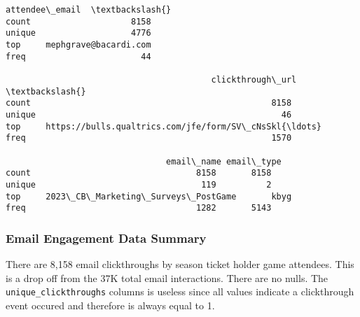 \documentclass[11pt]{article}
\makeatletter
\newcommand{\boxspacing}{\kern\kvtcb@left@rule\kern\kvtcb@boxsep}
\newcommand{\prompt}[4]{
        {\ttfamily\llap{{\color{#2}[#3]:\hspace{3pt}#4}}\vspace{-\baselineskip}}
    }
\makeatother
\begin{document}
            \begin{tcolorbox}[breakable, size=fbox, boxrule=.5pt, pad at break*=1mm, opacityfill=0]
\prompt{Out}{outcolor}{16}{\boxspacing}
\begin{Verbatim}[commandchars=\\\{\}]
               attendee\_email  \textbackslash{}
count                    8158
unique                   4776
top     mephgrave@bacardi.com
freq                       44

                                         clickthrough\_url  \textbackslash{}
count                                                8158
unique                                                 46
top     https://bulls.qualtrics.com/jfe/form/SV\_cNsSkl{\ldots}
freq                                                 1570

                                email\_name email\_type
count                                 8158       8158
unique                                 119          2
top     2023\_CB\_Marketing\_Surveys\_PostGame       kbyg
freq                                  1282       5143
\end{Verbatim}
\end{tcolorbox}
        
    \subsubsection{Email Engagement Data
Summary}\label{email-engagement-data-summary}

There are 8,158 email clickthroughs by season ticket holder game
attendees. This is a drop off from the 37K total email interactions.
There are no nulls. The \texttt{unique\_clickthroughs} columns is
useless since all values indicate a clickthrough event occured and
therefore is always equal to 1.
\end{document}
